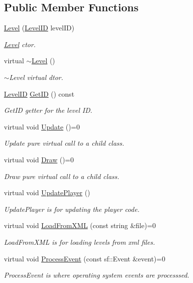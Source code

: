 \subsection*{Public Member Functions}
\begin{DoxyCompactItemize}
\item 
\hyperlink{class_level_a638468d7d98ba422bbcaf2e5ea05d421}{Level} (\hyperlink{_level_8hpp_aa0e387304096fe83aba77c85cb7be77a}{Level\-I\-D} level\-I\-D)
\begin{DoxyCompactList}\small\item\em \hyperlink{class_level}{Level} ctor. \end{DoxyCompactList}\item 
virtual \hyperlink{class_level_a249eac1e8f19ff44134efa5e986feaca}{$\sim$\-Level} ()
\begin{DoxyCompactList}\small\item\em $\sim$\-Level virtual dtor. \end{DoxyCompactList}\item 
\hyperlink{_level_8hpp_aa0e387304096fe83aba77c85cb7be77a}{Level\-I\-D} \hyperlink{class_level_a03ef47d6709e8b62568cfaad9decfd0e}{Get\-I\-D} () const 
\begin{DoxyCompactList}\small\item\em Get\-I\-D getter for the level I\-D. \end{DoxyCompactList}\item 
virtual void \hyperlink{class_level_a540d45e6d0ed7ce481d985881e8e27e2}{Update} ()=0
\begin{DoxyCompactList}\small\item\em Update pure virtual call to a child class. \end{DoxyCompactList}\item 
virtual void \hyperlink{class_level_a308eb5521217a781d2357ba83d041054}{Draw} ()=0
\begin{DoxyCompactList}\small\item\em Draw pure virtual call to a child class. \end{DoxyCompactList}\item 
virtual void \hyperlink{class_level_a95bbafd05f5aa2396c36ff8343c62a2f}{Update\-Player} ()
\begin{DoxyCompactList}\small\item\em Update\-Player is for updating the player code. \end{DoxyCompactList}\item 
virtual void \hyperlink{class_level_a26a3990bd47120e8e5c59f71d29ccb0a}{Load\-From\-X\-M\-L} (const string \&file)=0
\begin{DoxyCompactList}\small\item\em Load\-From\-X\-M\-L is for loading levels from xml files. \end{DoxyCompactList}\item 
virtual void \hyperlink{class_level_af8c86b5de9abc37b7f639fd9f5e9ea8e}{Process\-Event} (const sf\-::\-Event \&event)=0
\begin{DoxyCompactList}\small\item\em Process\-Event is where operating system events are processsed. \end{DoxyCompactList}\end{DoxyCompactItemize}
